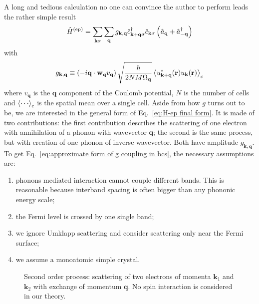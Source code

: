 A long and tedious calculation no one can convince the author to perform leads the rather simple result
\begin{equation}\label{eq:H-ep final form}
	\hat H^{(\mathrm{ep})} = \sum_{\mathbf{k}\sigma} \sum_\mathbf{q} g_{\mathbf{k},\mathbf{q}} \hat{c}_{\mathbf{k}+\mathbf{q}\sigma}^\dagger \hat{c}_{\mathbf{k}\sigma} \left({
		\hat{a}_\mathbf{q} + \hat{a}_{-\mathbf{q}}^\dagger
	}\right)
\end{equation}
with
\begin{equation}\label{eq:approximate form of g coupling in bcs}
	g_{\mathbf{k},\mathbf{q}} \equiv \lrR{-i\mathbf{q} \cdot \mathbf{w}_\mathbf{q} v_\mathbf{q}} \sqrt{\frac{\hbar}{2 N M \Omega_\mathbf{q}}} \ev{u_{\mathbf{k}+\mathbf{q}}^*(\mathbf{r}) u_\mathbf{k}(\mathbf{r})}_c
\end{equation}
where $v_\mathbf{q}$ is the $\mathbf{q}$ component of the Coulomb potential, $N$ is the number of cells and $\ev{\cdots}_c$ is the spatial mean over a single cell. Aside from how $g$ turns out to be, we are interested in the general form of Eq.~\eqref{eq:H-ep final form}. It is made of two contributions: the first contribution describes the scattering of one electron with annihilation of a phonon with wavevector $\mathbf{q}$; the second is the same process, but with creation of one phonon of inverse wavevector. Both have amplitude $g_{\mathbf{k},\mathbf{q}}$.
To get Eq.~\eqref{eq:approximate form of g coupling in bcs}, the necessary assumptions are:
\begin{enumerate}
	\item phonons mediated interaction cannot couple different bands. This is reasonable because interband spacing is often bigger than any phononic energy scale;
	\item the Fermi level is crossed by one single band;
	\item we ignore Umklapp scattering and consider scattering only near the Fermi surface;
	\item we assume a monoatomic simple crystal.
\end{enumerate}

\begin{figure}
	\centering
	
	\caption{Second order process: scattering of two electrons of momenta $\mathbf{k}_1$ and $\mathbf{k}_2$ with exchange of momentum $\mathbf{q}$. No spin interaction is considered in our theory.}
	\label{fig:second order process}
\end{figure}

